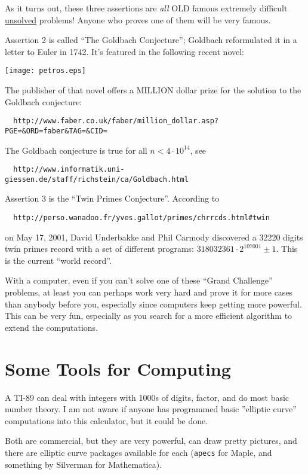 \documentclass[11pt]{report}
\begin{document}
As it turns out, these three assertions are {\em all} OLD famous
extremely difficult \underline{unsolved} problems!  Anyone who proves
one of them will be very famous.


Assertion 2 is called ``The Goldbach Conjecture'';
Goldbach reformulated it in a letter to Euler in 1742.  It's
featured in the following recent novel:
\begin{center}
  \texttt{[image: petros.eps]}
\end{center}

The publisher of that novel offers a MILLION dollar prize
for the solution to the Goldbach conjecture:
\begin{verbatim}
  http://www.faber.co.uk/faber/million_dollar.asp?PGE=&ORD=faber&TAG=&CID=
\end{verbatim}
The Goldbach conjecture is true for all $n<4\cdot 10^{14}$, see
\begin{verbatim}
  http://www.informatik.uni-giessen.de/staff/richstein/ca/Goldbach.html
\end{verbatim}


Assertion 3 is the ``Twin Primes Conjecture''. According to
\begin{verbatim}
  http://perso.wanadoo.fr/yves.gallot/primes/chrrcds.html#twin
\end{verbatim}
on May 17, 2001, David Underbakke and Phil Carmody discovered
a 32220 digits twin primes record with a set of different
programs: $318032361\cdot 2^{107001}\pm 1$.  This is the current
``world record''.

With a computer, even if you can't solve one of these ``Grand
Challenge'' problems, at least you can perhaps work very hard and
prove it for more cases than anybody before you, especially since
computers keep getting more powerful.  This can be very fun,
especially as you search for a more efficient algorithm to extend the
computations.


\section{Some Tools for Computing}
 A TI-89 can deal with integers with 1000s of
digits, factor, and do most basic number theory.  I am not aware
if anyone has programmed basic ''elliptic curve'' computations into
this calculator, but it could be done.

 Both are commercial, but they are very
powerful, can draw pretty pictures, and there are elliptic curve
packages available for each ({\tt apecs} for Maple, and something
by Silverman for Mathematica).
\end{document}
